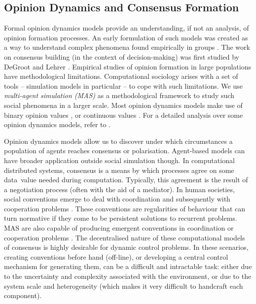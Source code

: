 \documentclass[preprint,number]{elsarticle}
\begin{document}
	\subsection{Opinion Dynamics and Consensus Formation}
        \noindent Formal opinion dynamics models provide an understanding, if not an analysis, of
        opinion formation processes. An early formulation of such models was created as a way to
        understand complex phenomena found empirically in groups \cite{French1956}. The work on
        consensus building (in the context of decision-making) was first studied by DeGroot
        \cite{Degroot74} and Lehrer \cite{Lehrer1975}. Empirical studies of opinion formation in
        large populations have methodological limitations. Computational sociology arises with a set
        of tools -- simulation models in particular -- to cope with such limitations. We use
        \textit{multi-agent simulation (MAS)} as a methodological framework to study such social
        phenomena in a larger scale. Most opinion dynamics models make use of binary opinion values
        \cite{Galam1997,Antunes2009}, or continuous values \cite{Deffuant2000,Deffuant2002}. For a
        detailed analysis over some opinion dynamics models, refer to \cite{Hegselmann2002}.
	
	Opinion dynamics models allow us to discover under which circumstances a population of
        agents reaches consensus or polarisation. Agent-based models can have broader application
        outside social simulation though. In computational distributed systems, consensus is a means
        by which processes agree on some data~value needed during computation. Typically, this
        agreement is the result of a negotiation process (often with the aid of a mediator). In
        human societies, social conventions emerge to deal with coordination and subsequently with
        cooperation problems \cite{Lewis1969}. These conventions are regularities of behaviour that
        can turn normative if they come to be persistent solutions to recurrent problems. MAS are
        also capable of producing emergent conventions in coordination or cooperation problems
        \cite{Delgado2002}. The decentralised nature of these computational models of consensus is
        highly desirable for dynamic control problems. In these scenarios, creating conventions
        before hand (off-line), or developing a central control mechanism for generating them, can
        be a difficult and intractable task: either due to the uncertainty and complexity associated
        with the environment, or due to the system scale and heterogeneity (which makes it very
        difficult to handcraft each component).
	
\end{document}
